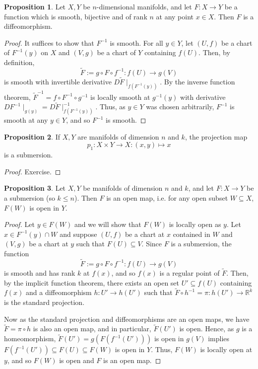 \documentclass[]{article}
\theoremstyle{definition}
\theoremstyle{definition}
\newtheorem{proposition}{Proposition}[section]
\begin{document}
\begin{proposition}
  Let \(X, Y\) be \(n\)-dimensional manifolds, and let \(F : X \to Y\) be a 
  function which is smooth, bijective and of rank \(n\) at any point \(x \in X\). 
  Then \(F\) is a diffeomorphism.
\end{proposition}
\begin{proof}
  It suffices to show that \(F^{-1}\) is smooth. For all \(y \in Y\), let 
  \((U, f)\) be a chart of \(F^{-1}(y)\) on \(X\) and \((V, g)\) be a chart of 
  \(Y\) containing \(f(U)\). Then, by definition, 
  \[\tilde F := g \circ F \circ f^{-1} : f(U) \to g(V)\]
  is smooth with invertible derivative \(D \tilde F\mid_{f(F^{-1}(y))}\). 
  By the inverse function theorem, \(\tilde F^{-1} = f \circ F^{-1} \circ g^{-1}\) 
  is locally smooth at \(g^{-1}(y)\) with derivative 
  \(D F^{-1}\mid_{g(y)} = D \tilde F\mid_{f(F^{-1}(y))}^{-1}\). Thus, as 
  \(y \in Y\) was chosen arbitrarily, \(F^{-1}\) is smooth at any \(y \in Y\), 
  and so \(F^{-1}\) is smooth. 
\end{proof}

\begin{proposition}
  If \(X, Y\) are manifolds of dimension \(n\) and \(k\), the projection map 
  \[p_1 : X \times Y \to X : (x, y) \mapsto x\]
  is a submersion.
\end{proposition}
\begin{proof}
  Exercise.
\end{proof}

\begin{proposition}
  Let \(X, Y\) be manifolds of dimension \(n\) and \(k\), and let \(F : X \to Y\) 
  be a submersion (so \(k \le n\)). Then \(F\) is an open map, i.e. for any 
  open subset \(W \subseteq X\), \(F(W)\) is open in \(Y\).
\end{proposition}
\begin{proof}
  Let \(y \in F(W)\) and we will show that \(F(W)\) is locally open as \(y\). 
  Let \(x \in F^{-1}(y) \cap W\) and suppose \((U, f)\) be a chart at \(x\) 
  contained in \(W\) and \((V, g)\) be a chart at \(y\) such that 
  \(F(U) \subseteq V\). Since \(F\) is a submersion, the function 
  \[\tilde F := g \circ F \circ f^{-1} : f(U) \to g(V)\]
  is smooth and has rank \(k\) at \(f(x)\), and so \(f(x)\) is a regular point 
  of \(\tilde F\). Then, by the implicit function theorem, 
  there exists an open set \(U' \subseteq f(U)\) containing \(f(x)\) and a 
  diffeomorphism \(h : U' \to h(U')\) such that 
  \(\tilde F \circ h^{-1} = \pi : h(U') \to \mathbb{R}^k\) is the standard 
  projection.

  Now as the standard projection and diffeomorphisms are an open maps, we have 
  \(\tilde F = \pi \circ h\) is also an open map, and in particular, 
  \(\tilde F(U')\) is open. Hence, as \(g\) is a homeomorphism, 
  \(\tilde F(U') = g(F(f^{-1}(U')))\) is open in \(g(V)\) implies 
  \(F(f^{-1}(U')) \subseteq F(U) \subseteq F(W)\) is open in \(Y\). Thus, 
  \(F(W)\) is locally open at \(y\), and so \(F(W)\) is open and \(F\) is an 
  open map.
\end{proof}
\end{document}
